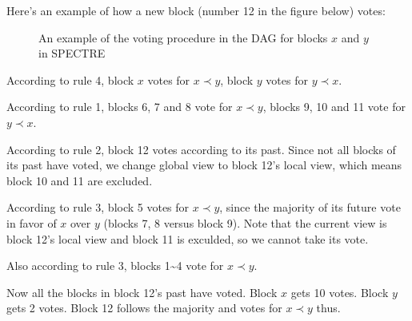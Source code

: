 \documentclass[a4paper,11pt]{article}
\begin{document}
Here's an example of how a new block (number 12 in the figure below) votes:

\begin{figure}[h]
	\centerline{%
	}
\caption{An example of the voting procedure in the DAG for blocks $x$ and $y$ in SPECTRE}
\end{figure}

According to rule 4, block $x$ votes for $x \prec y$, block $y$ votes for $y
\prec x$.

According to rule 1, blocks 6, 7 and 8 vote for $x \prec y$, blocks 9, 10 and 11
vote for $y \prec x$.

According to rule 2, block 12 votes according to its past. Since not all blocks
of its past have voted, we change global view to block 12's local view, which
means block 10 and 11 are excluded.

According to rule 3, block 5 votes for $x \prec y$, since the majority of its
future vote in favor of $x$ over $y$ (blocks 7, 8 versus block 9). Note that the
current view is block 12's local view and block 11 is exculded, so we cannot
take its vote.

Also according to rule 3, blocks 1\textasciitilde4 vote for $x \prec y$.

Now all the blocks in block 12's past have voted. Block $x$ gets 10 votes. Block
$y$ gets 2 votes. Block 12 follows the majority and votes for $x \prec y$ thus.
\end{document}
